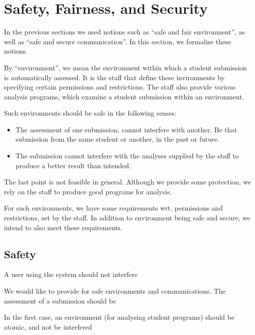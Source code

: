 
\section{Safety, Fairness, and Security}

In the previous sections we used notions such as ``safe and fair environment'',
as well as ``safe and secure communication''. In this section, we formalise
these notions.

By ``environment'', we mean the environment within which a student submission
is automatically assessed. It is the staff that define these invironments by
specifying certain permissions and restrictions. The staff also provide various
analysis programs, which examine a student submission within an environment.

Such environments should be safe in the following senses:

\begin{itemize}

\item The assessment of one submission, cannot interfere with another. Be that
submission from the same student or another, in the past or future.

\item The submission cannot interfere with the analyses supplied by the staff
to produce a better result than intended.

\end{itemize}

The last point is not feasible in general. Although we provide some protection,
we rely on the staff to produce good programs for analysis.

For such environments, we have some
requirements wrt. permissions and restrictions, set by the staff. In addition
to environment being safe and secure, we intend to also meet these
requirements.

\subsection{Safety}

A user using the system should not interfere

We would like to provide for safe environments and communications. The assessment of a submission should be 

In the first case, an environment (for analysing student programs) should be atomic, and not be interfered 

